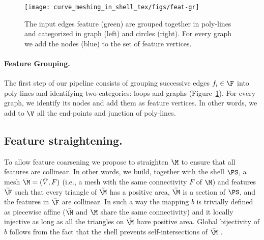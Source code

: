 \begin{figure}
    \centering
    \texttt{[image: curve\_meshing\_in\_shell\_tex/figs/feat-gr]}
    \caption{The input edges feature (green) are grouped together in poly-lines and categorized in graph (left) and circles (right). For every graph we add the nodes (blue) to the set of feature vertices.}
    \label{bichon:fig:feat-gr}
\end{figure}

\paragraph{Feature Grouping.}
The first step of our pipeline consists of grouping successive edges $f_i\in\F$ into poly-lines and identifying two categories: loops and graphs (Figure~\ref{bichon:fig:feat-gr}). For every graph, we identify its nodes and add them as feature vertices. In other words, we add to $\V$ all the end-points and junction of poly-lines.



\subsection{Feature straightening.}\label{cumin:sec:snapping}
To allow feature coarsening we propose to straighten $\M$ to ensure that all features are collinear. In other words, we build, together with the shell $\PS$, a mesh $\bar\M = (\bar V,F)$ (i.e., a mesh with the same connectivity $F$ of $\M$) and features $\bar \F$ such that every triangle of $\bar \M$ has a positive area, $\bar \M$ is a section of $\PS$, and the features in $\bar\F$ are collinear. In such a way the mapping $b$ is trivially defined as piecewise affine ($\bar\M$ and $\M$ share the same connectivity) and it locally injective as long as all the triangles on $\bar\M$ have positive area. Global bijectivity of $b$ follows from the fact that the shell prevents self-intersections of $\bar\M$ .


